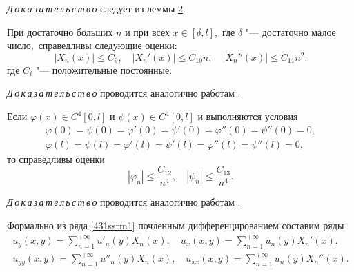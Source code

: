 \smallskip

\textit{Д\,о\,к\,а\,з\,а\,т\,е\,л\,ь\,с\,т\,в\,о\/} следует из леммы \hyperlink{saf:lemma:2}{2}.

\smallskip

\hypertarget{saf:lemma:4}{}

\begin{lemma}[4]При достаточно больших $n$ и при всех $x\in [\delta,l],$ где $\delta$ "--- достаточно малое число$,$  справедливы следующие оценки{\rm\/:}
\begin{equation*}
|X_{n}(x)|\leq C_{9},
\quad 
|X_{n}'(x)|\leq C_{10}n,
\quad 
|X_{n}''(x)|\leq C_{11}n^{2}.
\end{equation*}
где $C_{i}$ "--- положительные постоянные$.$
\end{lemma}
\smallskip

\textit{Д\,о\,к\,а\,з\,а\,т\,е\,л\,ь\,с\,т\,в\,о\/}  проводится аналогично работам
\cite{safina:Saf2, safina:SafDu}.


\smallskip

\hypertarget{saf:lemma:5}{}

\begin{lemma}[5]Если  $\varphi(x)\in C^{4}[0, l]$ и $\psi(x)\in C^{4}[0,l]$ и выполняются условия
\begin{gather}
\varphi(0)=\psi(0)=\varphi'(0)=\psi'(0)=\varphi''(0)=\psi''(0)=0,\\
\varphi(l)=\psi(l)=\varphi'(l)=\psi'(l)=\varphi''(l)=\psi''(l)=0,
\end{gather}
то справедливы оценки
\begin{equation*}
|\varphi_{n}|\leq\frac{C_{12}}{n^{4}},  \quad 
|\psi_{n}|\leq\frac{C_{13}}{n^{4}}.
\end{equation*}
\end{lemma}

\smallskip

\textit{Д\,о\,к\,а\,з\,а\,т\,е\,л\,ь\,с\,т\,в\,о\/}  проводится аналогично работам \cite{safina:Saf2, safina:SafDu}.

\smallskip

Формально из ряда \eqref{431ssrm1} почленным дифференцированием составим ряды
 \begin{gather}
\label{448ssrm1}
u_{y}(x,y)=\sum_{n=1}^{+\infty}u'_{n}(y)X_{n}(x), \quad 
u_{x}(x,y)=\sum_{n=1}^{+\infty}u_{n}(y)X_{n}'(x).
\\
 \label{449ssrm1}
u_{yy}(x,y)=\sum_{n=1}^{+\infty} u''_{n}(y)X_{n}(x), \quad  
u_{x x}(x,y)=\sum_{n=1}^{+\infty}u_{n}(y)X_{n}''(x).
\end{gather}

